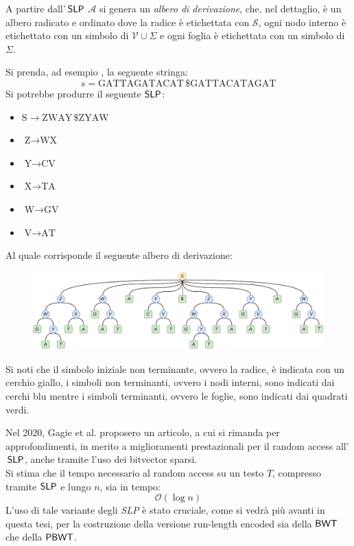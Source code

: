 A partire dall'$\,\mbox{\rm {\sf SLP}}$ $\mathcal{A}$ si genera un \textit{albero
  di derivazione}, che, nel dettaglio, è un albero radicato e ordinato
dove la radice è etichettata con $\mathcal{S}$, ogni nodo
  interno è etichettato con un simbolo di $\mathcal{V}\cup\Sigma$ e ogni foglia
è etichettata con un simbolo di $\Sigma$.
\begin{esempio}
  \label{ese:slpgagie}
  Si prenda, ad esempio \cite{slpgagie}, la seguente stringa:
  \[s=\mbox{GATTAGATACAT}\,\$\mbox{GATTACATAGAT}\]
  Si potrebbe produrre il seguente $\mbox{\rm {\sf SLP}}$:
  \begin{multicols}{3}
    \begin{itemize}
      \item $\mbox{S}\to \mbox{ZWAY}\,\$\mbox{ZYAW}$
      \item $\mbox{Z}\to \mbox{WX}$
      \item $\mbox{Y}\to \mbox{CV}$
      \item $\mbox{X}\to \mbox{TA}$
      \item $\mbox{W}\to \mbox{GV}$
      \item $\mbox{V}\to \mbox{AT}$
    \end{itemize}
  \end{multicols}
  Al quale corrisponde il seguente albero di derivazione:
  \begin{figure}[H]
    \centering
    \includegraphics[width=\textwidth]{img/slpgagie.pdf}
  \end{figure}
  Si noti che il simbolo
  iniziale non terminante, ovvero la radice, è indicata con un cerchio giallo, i
  simboli non terminanti, ovvero i nodi interni, sono indicati dai cerchi blu
  mentre i simboli terminanti, ovvero le foglie, sono indicati dai quadrati
  verdi.
\end{esempio}
Nel 2020, Gagie et al. \cite{slpgagie} 
proposero un articolo, a cui si rimanda per approfondimenti, in merito a
miglioramenti prestazionali per il random access all'$\,\mbox{\rm {\sf SLP}}$,
anche tramite l'uso dei bitvector sparsi.\\
Si stima che il tempo necessario al random access su un testo $T$, compresso
tramite $\mbox{\rm {\sf SLP}}$ e lungo $n$, sia in tempo: 
\begin{equation}
  \label{eq:slptime}
  \mathcal{O}\left(\log n\right)
\end{equation}
L'uso di tale variante degli \textit{SLP} è stato cruciale, come si vedrà più
avanti in questa tesi, per la costruzione della versione run-length encoded sia
della $\mbox{\rm {\sf BWT}}$ che della $\mbox{\rm {\sf PBWT}}$.
